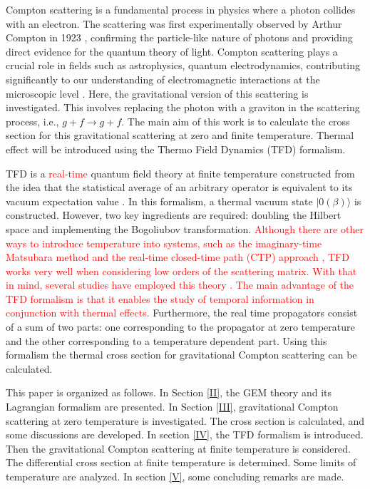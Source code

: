 \documentclass[11pt,showpacs,preprintnumbers,amsmath,amssymb,prd,nofootinbib,superscriptaddress]{revtex4-2}
\begin{document}
Compton scattering is a fundamental process in physics where a photon collides with an electron. The scattering was first experimentally observed by Arthur Compton in 1923 \cite{Compton}, confirming the particle-like nature of photons and providing direct evidence for the quantum theory of light. Compton scattering plays a crucial role in fields such as astrophysics, quantum electrodynamics, contributing significantly to our understanding of electromagnetic interactions at the microscopic level \textcolor{red}{\cite{cabral}}. Here, the gravitational version of this scattering is investigated. This involves replacing the photon with a graviton in the scattering process, i.e., $g+f\xrightarrow{}g+f$. The main aim of this work is to calculate the cross section for this gravitational scattering at zero and finite temperature. Thermal effect will be introduced using the Thermo Field Dynamics (TFD) formalism.

TFD is a \textcolor{red}{real-time} quantum field theory at finite temperature constructed from the idea that the statistical average of an arbitrary operator is equivalent to its vacuum expectation value \cite{Umezawa1, Umezawa2, Book, Umezawa22, Khanna1, Khanna2, Santana1, Santana2}. In this formalism, a thermal vacuum state $|0(\beta)\rangle$ is constructed. However, two key ingredients are required: doubling the Hilbert space and implementing the Bogoliubov transformation. \textcolor{red}{Although there are other ways to introduce temperature into systems, such as the imaginary-time Matsubara method \cite{matsubara} and the real-time closed-time path (CTP) approach \cite{schwinger1961brownian}, TFD works very well when considering low orders of the scattering matrix. With that in mind, several studies have employed this theory \cite{alesandrogravitacional, Casimir, santos2017lorentz, santos2016quantized, cabral2023thermal, cabral2024lorentz}. The main advantage of the TFD formalism is that it enables the study of temporal information in conjunction with thermal effects.} Furthermore, the real time propagators consist of a sum of two parts: one corresponding to the propagator at zero temperature and the other corresponding to a temperature dependent part. Using this formalism the thermal cross section for gravitational Compton scattering can be calculated.

This paper is organized as follows. In Section \ref{II}, the GEM theory and its Lagrangian formalism are presented. In Section \ref{III}, gravitational Compton scattering at zero temperature is investigated. The cross section is calculated, and some discussions are developed. In section \ref{IV}, the TFD formalism is introduced. Then the gravitational Compton scattering at finite temperature is considered. The differential cross section at finite temperature is determined. Some limits of temperature are analyzed. In section \ref{V}, some concluding remarks are made.
 
\end{document}
